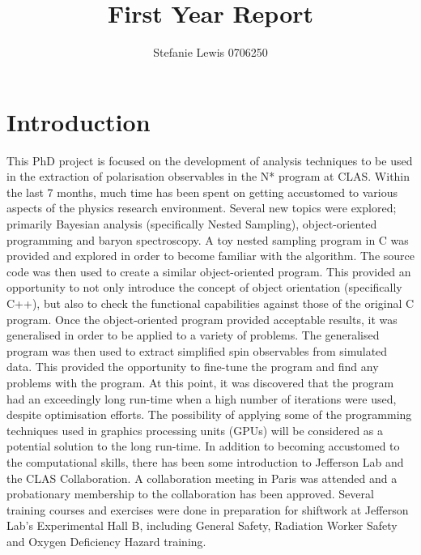 \documentclass[a4paper,12pt]{article}
\title{First Year Report}
\author{Stefanie Lewis 0706250}
\begin{document}
\maketitle

\begin{abstract}

\end{abstract}

\newpage
\tableofcontents

\newpage

\section{Introduction}
This PhD project is focused on the development of analysis techniques to be used in the extraction of polarisation observables in the N* program at CLAS.  
Within the last 7 months, much time has been spent on getting accustomed to various aspects of the physics research environment.  Several new topics were explored; primarily Bayesian analysis (specifically Nested Sampling), object-oriented programming and baryon spectroscopy.  
\newline
A toy nested sampling program in C was provided and explored in order to become familiar with the algorithm.  The source code was then used to create a similar object-oriented program.  This provided an opportunity to not only introduce the concept of object orientation (specifically C++), but also to check the functional capabilities against those of the original C program.  Once the object-oriented program provided acceptable results, it was generalised in order to be applied to a variety of problems.  
\newline
The generalised program was then used to extract simplified spin observables from simulated data. This provided the opportunity to fine-tune the program and find any problems with the program. At this point, it was discovered that the program had an exceedingly long run-time when a high number of iterations were used, despite optimisation efforts.  The possibility of applying some of the programming techniques used in graphics processing units (GPUs) will be considered as a potential solution to the long run-time.
\newline
In addition to becoming accustomed to the computational skills, there has been some introduction to Jefferson Lab and the CLAS Collaboration.  A collaboration meeting in Paris was attended and a probationary membership to the collaboration has been approved.  Several training courses and exercises were done in preparation for shiftwork at Jefferson Lab's Experimental Hall B, including General Safety, Radiation Worker Safety and Oxygen Deficiency Hazard training.  
\end{document}
